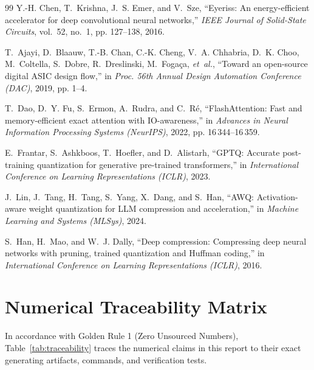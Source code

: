 \documentclass[11pt,a4paper]{article}
\begin{document}
\begin{thebibliography}{99}
Y.-H. Chen, T.~Krishna, J.~S. Emer, and V.~Sze, ``Eyeriss: An energy-efficient accelerator for deep convolutional neural networks,'' \emph{IEEE Journal of Solid-State Circuits}, vol.~52, no.~1, pp. 127--138, 2016.

T.~Ajayi, D.~Blaauw, T.-B. Chan, C.-K. Cheng, V.~A. Chhabria, D.~K. Choo, M.~Coltella, S.~Dobre, R.~Dreslinski, M.~Foga{\c{c}}a, \emph{et~al.}, ``Toward an open-source digital ASIC design flow,'' in \emph{Proc. 56th Annual Design Automation Conference (DAC)}, 2019, pp. 1--4.

T.~Dao, D.~Y. Fu, S.~Ermon, A.~Rudra, and C.~R{\'e}, ``FlashAttention: Fast and memory-efficient exact attention with IO-awareness,'' in \emph{Advances in Neural Information Processing Systems (NeurIPS)}, 2022, pp. 16\,344--16\,359.

E.~Frantar, S.~Ashkboos, T.~Hoefler, and D.~Alistarh, ``GPTQ: Accurate post-training quantization for generative pre-trained transformers,'' in \emph{International Conference on Learning Representations (ICLR)}, 2023.

J.~Lin, J.~Tang, H.~Tang, S.~Yang, X.~Dang, and S.~Han, ``AWQ: Activation-aware weight quantization for LLM compression and acceleration,'' in \emph{Machine Learning and Systems (MLSys)}, 2024.

S.~Han, H.~Mao, and W.~J. Dally, ``Deep compression: Compressing deep neural networks with pruning, trained quantization and Huffman coding,'' in \emph{International Conference on Learning Representations (ICLR)}, 2016.
\end{thebibliography}

\appendix
\section{Numerical Traceability Matrix}
In accordance with Golden Rule 1 (Zero Unsourced Numbers), Table~\ref{tab:traceability} traces the numerical claims in this report to their exact generating artifacts, commands, and verification tests.
\end{document}
